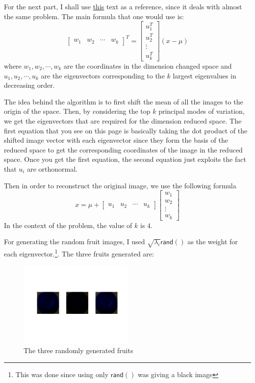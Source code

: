 \documentclass[12pt]{article}
\begin{document}
	For the next part, I shall use \href{https://www.cs.uoi.gr/~cnikou/Courses/Image_Analysis/08_PCA_and_Eigenfaces.pdf}{this} text as a reference, since it deals with almost the same problem. The main formula that one would use is:
	\begin{equation*}
		\begin{bmatrix}
			w_1 & w_2 & \cdots & w_k
		\end{bmatrix}
		^T
		= 
		\begin{bmatrix}
			u_1^T \\ u_2^T \\ \vdots \\ u_k^T
		\end{bmatrix}
		(x - \mu)
	\end{equation*}
	where $w_1,w_2,\cdots,w_k$ are the coordinates in the dimension changed space and $u_1,u_2,\cdots,u_k$ are the eigenvectors corresponding to the $k$ largest eigenvalues in decreasing order.

	The idea behind the algorithm is to first shift the mean of all the images to the origin of the space. Then, by considering the top $k$ principal modes of variation, we get the eigenvectors that are required for the dimension reduced space. The first equation that you see on this page is basically taking the dot product of the shifted image vector with each eigenvector since they form the basis of the reduced space to get the corresponding coordinates of the image in the reduced space. Once you get the first equation, the second equation just exploits the fact that $u_i$ are orthonormal.

	Then in order to reconstruct the original image, we use the following formula
	\begin{equation*}
		x = \mu + 
		\begin{bmatrix}
			u_1 & u_2 & \cdots & u_k
		\end{bmatrix}
		\begin{bmatrix}
			w_1 \\ w_2 \\ \vdots \\ w_k
		\end{bmatrix}
	\end{equation*}
	In the context of the problem, the value of $k$ is $4$.

	For generating the random fruit images, I used $\sqrt{\lambda_i}\mathsf{rand()}$ as the weight for each eigenvector.\footnote{This was done since using only $\mathsf{rand()}$ was giving a black image}. The three fruits generated are:
	\begin{figure}[h]
		\includegraphics[width=0.5\textwidth]{../results/6/problem6-c.png}
		\caption{The three randomly generated fruits}
	\end{figure}
\end{document}
